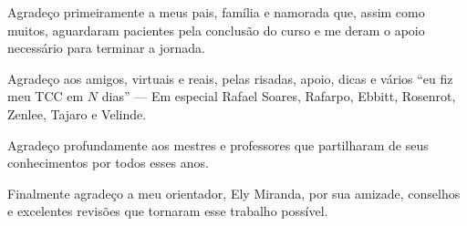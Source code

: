 \begin{agradecimentos}
	Agradeço primeiramente a meus pais, família e namorada que, assim como muitos, aguardaram pacientes pela conclusão do curso e me deram o apoio necessário para terminar a jornada.
    
    Agradeço aos amigos, virtuais e reais, pelas risadas, apoio, dicas e vários ``eu fiz meu TCC em \(N\) dias'' --- Em especial Rafael Soares, Rafarpo, Ebbitt, Rosenrot, Zenlee, Tajaro e Velinde.
    
    Agradeço profundamente aos mestres e professores que partilharam de seus conhecimentos por todos esses anos.
    
    Finalmente agradeço a meu orientador, Ely Miranda, por sua amizade, conselhos e excelentes revisões que tornaram esse trabalho possível.
\end{agradecimentos}